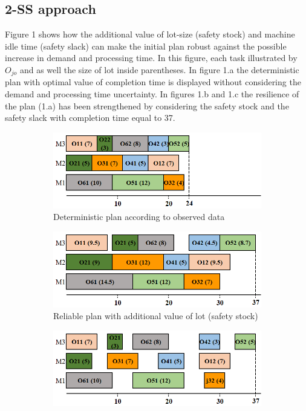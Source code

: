 \documentclass[letterpaper]{article} %
\begin{document}
\subsection{2-SS approach}
Figure 1 shows how the additional value of lot-size (safety stock) and machine idle time (safety slack) can make the initial plan robust against the possible increase in demand and processing time. In this figure, each task illustrated by $O_{jo}$ and as well the size of lot inside parentheses. In figure 1.a the deterministic plan with optimal value of completion time  is displayed without considering the demand and processing time uncertainty. In figures 1.b and 1.c the resilience of the plan (1.a) has been strengthened by considering the safety stock and the safety slack with completion time equal to 37.
\begin{figure}[t]
\begin{subfigure}{.46\textwidth}
  \centering
  \captionsetup{justification=centering}
  \includegraphics[width=0.9\columnwidth]{figure/fig2-1.png} %
  \caption{Deterministic plan according to observed data}
  \label{fig:fig1-1}
\end{subfigure}
\begin{subfigure}{.46\textwidth}
  \centering
  \captionsetup{justification=centering}
  \includegraphics[width=0.9\columnwidth]{figure/fig2-2.png} %
  \caption{Reliable plan with additional value of lot (safety stock)}
  \label{fig:fig1-2}
\end{subfigure}
\begin{subfigure}{.46\textwidth}
  \centering
  \captionsetup{justification=centering}
  \includegraphics[width=0.9\columnwidth]{figure/fig3-2.png} %

\end{subfigure}
\end{figure}
\end{document}
